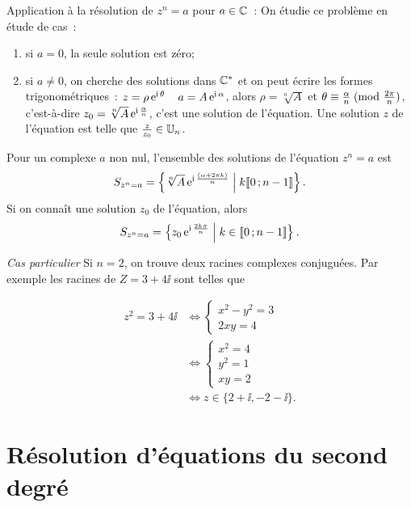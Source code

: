 Application à la résolution de \(z^n = a\) pour \(a \in \mathbb{C}\)~: On étudie ce 
problème en étude de cas~:
\begin{enumerate}
    \item si \(a = 0\), la seule solution est zéro;
    \item si \(a \neq 0\), on cherche des solutions dans \(\mathbb{C}^*\) et on peut 
        écrire les formes trigonométriques~: \(z = \rho \operatorname{e}^{\operatorname{i} \theta} \quad a = 
        A \operatorname{e}^{\operatorname{i} \alpha}\), alors \(\rho = \sqrt[n]{A}\) et 
        \(\theta \equiv \frac{\alpha}{n}\!\pmod {\frac{2\pi}{n}}\), c'est-à-dire 
        \(z_0 = \sqrt[n]{A}  \operatorname{e}^{\operatorname{i} \frac{\alpha}{n}}\), c'est une solution de 
        l'équation. Une solution \(z\) de l'équation est telle que 
        \(\frac{z}{z_0} \in \mathbb{U}_n\).
\end{enumerate}

\begin{prop}
    Pour un complexe \(a\) non nul, l'ensemble des solutions de l'équation \(z^n 
    = a\) est
    \begin{equation}
        S_{z^n = a} = \left\{\sqrt[n]{A} \operatorname{e}^{\operatorname{i} \frac{(\alpha + 2\pi k)}{n}}\mathrel{}\middle|\mathrel{}k 
        \mathopen{\llbracket}0\mathclose{}\mathpunct{};n-1\mathclose{\rrbracket}\right\}.
    \end{equation}
    Si on connaît une solution \(z_0\) de l'équation, alors
    \begin{equation}
        S_{z^n = a} = \left\{z_0 \operatorname{e}^{\operatorname{i} \frac{2 k \pi}{n}}\mathrel{}\middle|\mathrel{}k \in 
        \mathopen{\llbracket}0\mathclose{}\mathpunct{};n-1\mathclose{\rrbracket}\right\}.
    \end{equation}
\end{prop}

\emph{Cas particulier}
Si \(n = 2\), on trouve deux racines complexes conjuguées. Par exemple les 
racines de \(Z = 3 + 4\ii\) sont telles que

\begin{align*}
    z^2 = 3 + 4\ii & \iff  \begin{cases} x^2-y^2 = 3 \\ 2xy = 4 \end{cases} \\
               & \iff \begin{cases} x^2 = 4 \\ y^2 = 1 \\ xy = 2 \end{cases} \\
               & \iff z \in \{2 + \ii, -2-\ii\}.
\end{align*}

\section{Résolution d'équations du second degré}
\label{sec:resolutionequationseconddegre}

